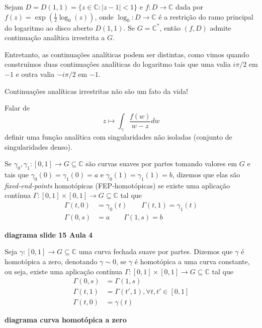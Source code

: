 \begin{exemplo}
Sejam $D = D(1,1) = \{ z\in\mathbb{C} : |z-1|<1 \}$ e $f:D\to\mathbb{C}$ dada por
$f(z) = \displaystyle{\exp\left( \frac{1}{2}\log_0(z) \right)}$, onde
$\log_0:D\to\mathbb{C}$ é a restrição do ramo principal do logaritmo ao disco aberto
$D(1,1)$. Se $G = \mathbb{C}^*$, então $(f,D)$ admite continuação analítica irrestrita
a $G$.

Entretanto, as continuações analíticas podem ser distintas, como vimos quando
construímos duas continuações analíticas do logaritmo tais que uma valia 
$i\pi/2$ em $-1$ e outra valia $-i\pi/2$ em $-1$.
\end{exemplo}

\begin{observacao}
Continuações analíticas irrestritas não são um fato da vida!

Falar de
\begin{equation*}
    z\mapsto \int_{\gamma} \frac{f(w)}{w-z}dw
\end{equation*}
definir uma função analítica com singularidades não isoladas (conjunto de singularidades
denso).
\end{observacao}

\begin{definicao}
\label{def-fep-homotopicas}
Se $\gamma_0, \gamma_1 :[0,1]\to G\subseteq\mathbb{C}$ são curvas suaves por partes
tomando valores em $G$ e tais que $\gamma_0(0) = \gamma_1(0) = a$ e 
$\gamma_0(1) = \gamma_1(1) = b$, dizemos que elas são \textit{fixed-end-points}
homotópicas (FEP-homotópicas) se existe uma aplicação contínua 
$\Gamma:[0,1]\times [0,1] \to G\subseteq\mathbb{C}$ tal que
\begin{align*}
    \Gamma(t,0) &= \gamma_0(t) \qquad \Gamma(t,1) = \gamma_1(t) \\
    \Gamma(0,s) &= a \qquad \Gamma(1,s) = b
\end{align*}

\begin{center}
    \textbf{diagrama slide 15 Aula 4}
\end{center}

\end{definicao}

\begin{definicao}
\label{def-homotopica-a-zero}
Seja $\gamma:[0,1]\to G\subseteq\mathbb{C}$ uma curva fechada suave por partes.
Dizemos que $\gamma$ é homotópica a zero, denotando $\gamma\sim 0$, se $\gamma$
é homotópica a uma curva constante, ou seja, existe uma aplicação contínua 
$\Gamma:[0,1]\times [0,1] \to G\subseteq\mathbb{C}$ tal que
\begin{align*}
    \Gamma(0,s) &= \Gamma(1,s) \\
    \Gamma(t,1) &= \Gamma(t',1), \forall t, t'\in [0,1] \\
    \Gamma(t,0) &= \gamma(t)
\end{align*}

\begin{center}
    \textbf{diagrama curva homotópica a zero}
\end{center}

\end{definicao}

